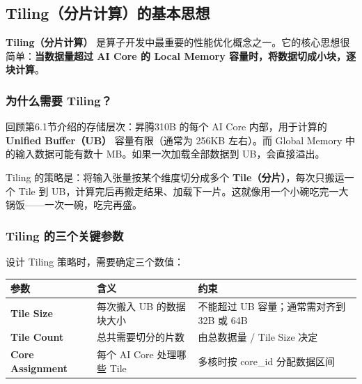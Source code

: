 \subsection{Tiling（分片计算）的基本思想}\label{src-book-chapter7-h37}

\textbf{Tiling（分片计算）}
是算子开发中最重要的性能优化概念之一。它的核心思想很简单：\textbf{当数据量超过
AI Core 的 Local Memory 容量时，将数据切成小块，逐块计算}。

\subsubsection{为什么需要 Tiling？}\label{src-book-chapter7-h38}

回顾第6.1节介绍的存储层次：昇腾310B 的每个 AI Core 内部，用于计算的
\textbf{Unified Buffer（UB）} 容量有限（通常为 256KB 左右）。而 Global
Memory 中的输入数据可能有数十 MB。如果一次加载全部数据到
UB，会直接溢出。

Tiling 的策略是：将输入张量按某个维度切分成多个
\textbf{Tile（分片）}，每次只搬运一个 Tile 到
UB，计算完后再搬走结果、加载下一片。这就像用一个小碗吃完一大锅饭------一次一碗，吃完再盛。

\subsubsection{Tiling 的三个关键参数}\label{src-book-chapter7-h39}

设计 Tiling 策略时，需要确定三个数值：

\begin{longtable}[]{@{}
  >{\raggedright\arraybackslash}p{}
  >{\raggedright\arraybackslash}p{}
  >{\raggedright\arraybackslash}p{}@{}}
\toprule\noalign{}
\begin{minipage}[b]{\linewidth}\raggedright
参数
\end{minipage} & \begin{minipage}[b]{\linewidth}\raggedright
含义
\end{minipage} & \begin{minipage}[b]{\linewidth}\raggedright
约束
\end{minipage} \\
\midrule\noalign{}
\endhead
\bottomrule\noalign{}
\endlastfoot
\textbf{Tile Size} & 每次搬入 UB 的数据块大小 & 不能超过 UB
容量；通常需对齐到 32B 或 64B \\
\textbf{Tile Count} & 总共需要切分的片数 & 由总数据量 / Tile Size
决定 \\
\textbf{Core Assignment} & 每个 AI Core 处理哪些 Tile & 多核时按
core\_id 分配数据区间 \\
\end{longtable}

